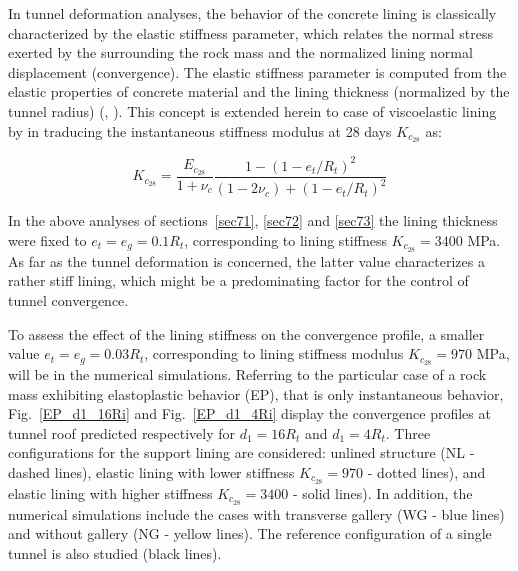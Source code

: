 \documentclass[Journal,letterpaper, NoLists,SectionNumbers]{ascelike-new}
\begin{document}
In tunnel deformation analyses, the behavior of the concrete lining is classically characterized by the elastic stiffness parameter, which relates the normal stress exerted by the surrounding the rock mass and the normalized lining normal displacement (convergence).   The elastic stiffness parameter is computed from the elastic properties of concrete material and the lining thickness (normalized by the tunnel radius) (, ). This concept is extended herein to case of viscoelastic lining by in traducing the instantaneous stiffness modulus at 28 days $K_{c_{28}}$ as:

\begin{equation} \label{eq:12}
	K_{c_{28}} = \frac{E_{c_{28}}}{1+\nu_c}\frac{1-(1-e_t/R_t)^2}{(1-2\nu_c)+(1-e_t/R_t)^2}
\end{equation}

In the above analyses of sections~\ref{sec71}, \ref{sec72} and \ref{sec73} the lining thickness were fixed to $e_t=e_g=0.1R_t$, corresponding to lining stiffness  $K_{c_{28}}=3400$ MPa. As far as the tunnel deformation is concerned, the latter value characterizes a rather stiff lining, which might be a predominating factor for the control of tunnel convergence.

To assess the effect of the lining stiffness on the convergence profile, a smaller value $e_t=e_g=0.03R_t$, corresponding to lining stiffness modulus $K_{c_{28}}=970$ MPa, will be in the numerical simulations. Referring to the particular case of a rock mass exhibiting elastoplastic behavior (EP), that is only instantaneous behavior, Fig.~\ref{EP_d1_16Ri} and Fig.~\ref{EP_d1_4Ri} display the convergence profiles at tunnel roof predicted respectively for $d_1=16R_t$ and $d_1=4R_t$.  Three configurations for the support lining are considered: unlined structure (NL - dashed lines), elastic lining with lower stiffness $K_{c_{28}}=970$ - dotted lines), and elastic lining with higher stiffness $K_{c_{28}}=3400$ - solid lines). In addition, the numerical simulations include the cases with transverse gallery (WG - blue lines) and without gallery (NG - yellow lines). The reference configuration of a single tunnel is also studied (black lines). 
\end{document}
